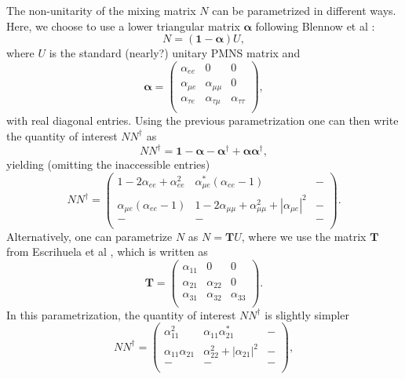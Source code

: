 The non-unitarity of the mixing matrix $N$ can be parametrized in different ways. Here, we choose to use a lower triangular matrix $\boldsymbol{\alpha}$ following Blennow et al \cite{Blennow2016}:
\begin{equation}
 N = (\boldsymbol{1} - \boldsymbol{\alpha}) U,
\end{equation}
where $U$ is the standard (nearly?) unitary PMNS matrix and 
\[
\boldsymbol{\alpha} =
  \begin{pmatrix}
    \alpha_{e e} & 0 & 0 \\
    \alpha_{\mu e} & \alpha_{\mu \mu} & 0 \\
    \alpha_{\tau e} & \alpha_{\tau \mu} & \alpha_{\tau \tau} \\
  \end{pmatrix},
\]
with real diagonal entries. Using the previous parametrization one can then write the quantity of interest $NN^{\dagger}$ as
\begin{equation}
 NN^{\dagger} = \boldsymbol{1} - \boldsymbol{\alpha} - \boldsymbol{\alpha}^{\dagger} + \boldsymbol{\alpha}\boldsymbol{\alpha}^{\dagger},
\end{equation}
yielding (omitting the inaccessible entries)
\[
NN^{\dagger} =
  \begin{pmatrix}
    1 - 2\alpha_{e e} +\alpha_{e e}^2 & \alpha_{\mu e}^*(\alpha_{ee}-1) & - \\
    \alpha_{\mu e}(\alpha_{ee}-1) & 1 - 2\alpha_{\mu \mu} + \alpha_{\mu \mu}^2 + |\alpha_{\mu e}|^2 & - \\
    - & - & - \\
  \end{pmatrix}.
\]
Alternatively, one can parametrize $N$ as $N = \boldsymbol{T} U$, where we use the matrix $\boldsymbol{T}$ from Escrihuela et al \cite{Escrihuela2015}, which is written as
\[
\boldsymbol{T} =
  \begin{pmatrix}
    \alpha_{11} & 0 & 0 \\
    \alpha_{21} & \alpha_{22} & 0 \\
    \alpha_{31} & \alpha_{32} & \alpha_{33} \\
  \end{pmatrix}.
\]
In this parametrization, the quantity of interest $NN^{\dagger}$ is slightly simpler
\[
NN^{\dagger} =
  \begin{pmatrix}
    \alpha_{11}^2 & \alpha_{11}\alpha_{21}^* & - \\
    \alpha_{11}\alpha_{21} & \alpha_{22}^2 + |\alpha_{21}|^2 & - \\
    - & - & - \\
  \end{pmatrix},
\]
